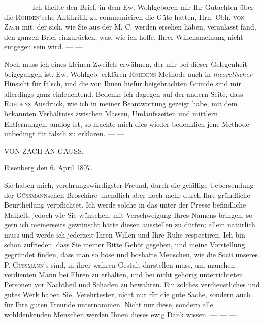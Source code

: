 --- --- --- Ich theilte den Brief, in dem Ew. Wohlgeboren mir Ihr Gutachten über die \textsc{Rohden}'sche Antikritik zu communiciren die Güte hatten, Hrn. Obh. \textsc{von Zach} mit, der sich, wie Sie aus der M. C. werden ersehen haben, veranlasst fand, den ganzen Brief einzurücken, was, wie ich hoffe, Ihrer Willensmeinung nicht entgegen sein wird. --- ---

Noch muss ich eines kleinen Zweifels erwähnen, der mir bei dieser Gelegenheit beigegangen ist. Ew. Wohlgeb. erklären \textsc{Rohdens} Methode auch in \emph{theoretischer} Hinsicht für falsch, und die von Ihnen hiefür beigebrachten Gründe sind mir allerdings ganz einleuchtend. Bedenke ich dagegen auf der andern Seite, dass \textsc{Rohdens} Ausdruck, wie ich in meiner Beantwortung gezeigt habe, mit dem bekannten Verhältniss zwischen Massen, Umlaufszeiten und mittlern Entfernungen, analog ist, so machte mich dies wieder bedenklich jene Methode unbedingt für falsch zu erklären. --- ---

\clearpage
\hypertarget{native-491-zach}{}
\label{native-491-zach}
\begin{center}
VON ZACH AN GAUSS.
\end{center}

\begin{flushright}Eisenberg den 6. April 1807.\end{flushright}

Sie haben mich, verehrungswürdigster Freund, durch die gefällige Uebersendung der \textsc{Güssmann}schen Broschüre unendlich aber noch mehr durch Ihre gründliche Beurtheilung verpflichtet. Ich werde solche in das unter der Presse befindliche Maiheft, jedoch wie Sie wünschen, mit Verschweigung Ihres Namens bringen, so gern ich meinerseits gewünscht hätte diesen ausstellen zu dürfen; allein natürlich muss und werde ich jederzeit Ihren Willen und Ihre Ruhe respectiren. Ich bin schon zufrieden, dass Sie meiner Bitte Gehör gegeben, und meine Vorstellung gegründet finden, dass man so böse und boshafte Menschen, wie die Socii unseres P. \textsc{Güssmann}'s sind, in ihrer wahren Gestalt darstellen muss, um manchen verdienten Mann bei Ehren zu erhalten, und bei nicht gehörig unterrichteten Personen vor Nachtheil und Schaden zu bewahren. Ein solches verdienstliches und gutes Werk haben Sie, Verehrtester, nicht nur für die gute Sache, sondern auch für Ihre guten Freunde unternommen. Nicht nur diese, sondern alle wohldenkenden Menschen werden Ihnen dieses ewig Dank wissen. --- --- ---
